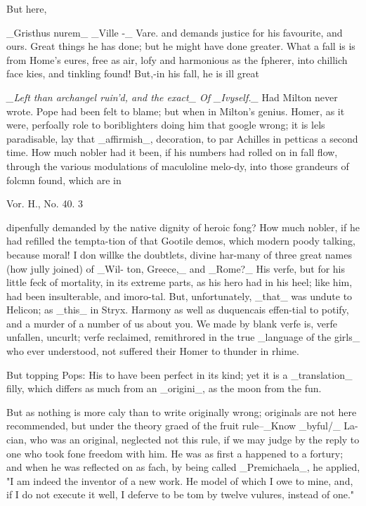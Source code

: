 \documentclass{article}
\begin{document}
But here,

\_Gristhus nurem\_ \_Ville -\_ Vare. and demands justice for his favourite, and ours. Great things he has done; but he might have done greater. What a fall is is from Home’s eures, free as air, lofy and harmonious as the fpherer, into chillich face kies, and tinkling found! But,-in his fall, he is ill great

\textit{\_Left than archangel ruin'd, and the exact\_ Of \_Ivyself.\_}
Had Milton never wrote. Pope had been felt to blame; but when in Milton’s genius. Homer, as it were, perfoally role to boriblighters doing him that google wrong; it is lels paradisable, lay that \_affirmish\_, decoration, to par Achilles in petticas a second time. How much nobler had it been, if his numbers had rolled on in fall flow, through the various modulations of maculoline melo-dy, into those grandeurs of folcmn found, which are in

Vor. H., No. 40. 3

dipenfully demanded by the native dignity of heroic fong? How much nobler, if he had refilled the tempta-tion of that Gootile demos, which modern poody talking, because moral! I don willke the doubtlets, divine har-many of three great names (how jully joined) of \_Wil- ton, Greece,\_ and \_Rome?\_ His verfe, but for his little feck of mortality, in its extreme parts, as his hero had in his heel; like him, had been insulterable, and imoro-tal. But, unfortunately, \_that\_ was undute to Helicon; as \_this\_ in Stryx. Harmony as well as duquencais effen-tial to potify, and a murder of a number of us about you. We made by blank verfe is, verfe unfallen, uncurlt; verfe reclaimed, remithrored in the true \_language of the girls\_ who ever understood, not suffered their Homer to thunder in rhime.

But topping Pops: His to have been perfect in its kind; yet it is a \_translation\_ filly, which differs as much from an \_origini\_, as the moon from the fun.

But as nothing is more caly than to write originally wrong; originals are not here recommended, but under the theory graed of the fruit rule--\_Know \_byful/\_ La- cian, who was an original, neglected not this rule, if we may judge by the reply to one who took fone freedom with him. He was as first a happened to a fortury; and when he was reflected on as fach, by being called \_Premichaela\_, he applied, "I am indeed the inventor of a new work. He model of which I owe to mine, and, if I do not execute it well, I deferve to be tom by twelve vulures, instead of one."
\end{document}
